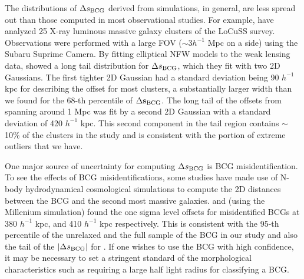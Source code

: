 The distributions of $\Delta s_{\rm BCG}$ derived from simulations, in general, 
are less spread out than those computed in most observational studies.
For example, \cite{Oguri2010} have analyzed 25 X-ray luminous 
massive galaxy clusters of the LoCuSS survey. 
Observations were performed with a large FOV ($\sim 3 h^{-1}$ Mpc on a side) 
using the Subaru Suprime Camera. 
By fitting elliptical NFW models to the weak lensing data, \cite{Oguri2010}
showed a long tail distribution for $\Delta s_{\rm BCG}$, which they fit with two 2D Gaussians.
The first tighter 2D Gaussian had a standard deviation being 90
$h^{-1}$ kpc for describing the
offset for most clusters, a substantially larger width than we found for the
68-th percentile of $\Delta {\bf s}_{\rm BCG}$. 
The long tail of the offsets from \cite{Oguri2010} spanning around 1 Mpc was fit by a second 2D
Gaussian with a standard deviation of 420 $h^{-1}$ kpc. This second component
in the tail region contains $\sim$ 10\% of the clusters in the study and is
consistent with the portion of extreme outliers that we have.   

One major source of uncertainty for computing $\Delta s_{\rm BCG}$ is
BCG misidentification.
To see the effects of BCG misidentifications, 
some studies have made use of N-body hydrodynamical cosmological
simulations to compute the 2D distances between the BCG and 
the second most massive galaxies. \cite{Johnston2007b} and 
\cite{Hilbert2010} (using the Millenium simulation)  found 
the one sigma level offsets for misidentified BCGs at 380 $h^{-1}$ kpc, and 410 
$h^{-1}$ kpc respectively. This is consistent with the 95-th percentile of the
unrelaxed and the full sample of the BCG in our study and also the tail of the
$|\Delta s_{\rm BCG}|$ for \cite{Cui2015}. If one wishes to use the BCG with high
confidence, it may be necessary to set a stringent standard of the morphological
characteristics such as requiring a large half light radius for classifying a BCG.

